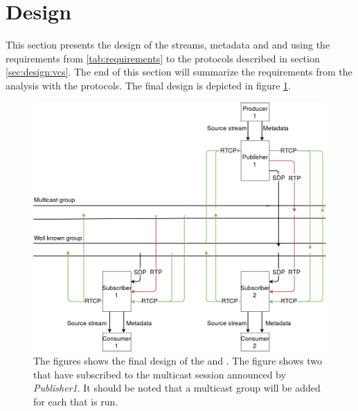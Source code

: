 \section{Design}
This section presents the design of the streams, metadata  and  and  using the requirements from \ref{tab:requirements} to the protocols described in section \ref{sec:design:vcs}. The end of this section will summarize the requirements from the analysis with the protocols.
The final design is depicted in figure \ref{fig:design:overall}. 
\begin{figure}[H]
	\centering
	\includegraphics[width=\textwidth]{figures/design_overall.png}
	\caption{The figures shows the final design of the \pubs{} and \subs{}. The figure shows two \pubs{} that have subscribed to the multicast session announced by \textit{Publisher1}. It should be noted that a multicast group will be added for each \pub{} that is run.} \label{fig:design:overall}
\end{figure}





